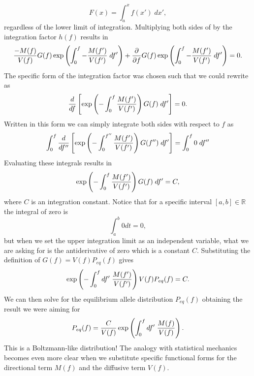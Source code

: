 \begin{equation}
  F(x) = \int_a^x f(x') \; dx',
\end{equation}
regardless of the lower limit of integration. Multiplying both sides of
 by the integration factor $h(f)$ results in
\begin{equation}
  {- M(f) \over V(f)} G(f)
  \exp \left( \int_0^f -{M(f') \over V(f')} \; df' \right)
  + {\partial \over \partial f} G(f)
  \exp \left( \int_0^f -{M(f') \over V(f')} \; df' \right)
  = 0.
  \label{eq_ode_int_fact}
\end{equation}
The specific form of the integration factor was chosen such that we could
rewrite  as
\begin{equation}
  {d \over df}
  \left[
  \exp \left(
  - \int_0^f {M(f') \over V(f')}
  \right)G(f) \; df'
  \right] = 0.
\end{equation}
Written in this form we can simply integrate both sides with respect to $f$ as
\begin{equation}
  \int_0^f {d \over df''}\left[
  \exp \left(
  - \int_0^{f''} {M(f') \over V(f')}
  \right) G(f'')\; df'
  \right] =
  \int_0^f 0 \; df''
\end{equation}
Evaluating these integrals results in
\begin{equation}
  \exp \left(
  - \int_0^{f} {M(f') \over V(f')}
  \right) G(f)\; df' = C,
\end{equation}
where $C$ is an integration constant. Notice that for a specific interval
$[a, b] \in \mathbb{R}$ the integral of zero is
\begin{equation}
  \int_a^b 0 dt = 0,
\end{equation}
but when we set the upper integration limit as an independent variable, what we
are asking for is the antiderivative of zero which is a constant $C$.
Substituting the definition of $G(f) = V(f) P_{eq}(f)$ gives
\begin{equation}
  \exp \left(
  - \int_0^f df' \; {M(f') \over V(f')}\right)
  V(f) P_{eq}(f) = C.
\end{equation}
We can then solve for the equilibrium allele distribution $P_{eq}(f)$ obtaining
the result we were aiming for
\begin{equation}
  P_{eq}(f) = {C \over V(f)} \exp \left(
  \int_0^f df' \; {M(f) \over V(f)}
  \right).
\end{equation}
This is a Boltzmann-like distribution! The analogy with statistical mechanics
becomes even more clear when we substitute specific functional forms for the
directional term $M(f)$ and the diffusive term $V(f)$.

